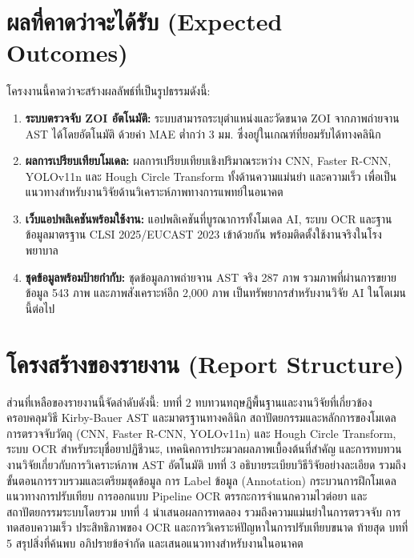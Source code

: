 \section{ผลที่คาดว่าจะได้รับ (Expected Outcomes)}

โครงงานนี้คาดว่าจะสร้างผลลัพธ์ที่เป็นรูปธรรมดังนี้:

\begin{enumerate}
  \item \textbf{ระบบตรวจจับ ZOI อัตโนมัติ:} ระบบสามารถระบุตำแหน่งและวัดขนาด ZOI จากภาพถ่ายจาน AST ได้โดยอัตโนมัติ ด้วยค่า MAE ต่ำกว่า 3 มม. ซึ่งอยู่ในเกณฑ์ที่ยอมรับได้ทางคลินิก
  \item \textbf{ผลการเปรียบเทียบโมเดล:} ผลการเปรียบเทียบเชิงปริมาณระหว่าง CNN, Faster R-CNN, YOLOv11n และ Hough Circle Transform ทั้งด้านความแม่นยำ และความเร็ว เพื่อเป็นแนวทางสำหรับงานวิจัยด้านวิเคราะห์ภาพทางการแพทย์ในอนาคต
  \item \textbf{เว็บแอปพลิเคชันพร้อมใช้งาน:} แอปพลิเคชันที่บูรณาการทั้งโมเดล AI, ระบบ OCR และฐานข้อมูลมาตรฐาน CLSI 2025/EUCAST 2023 เข้าด้วยกัน พร้อมติดตั้งใช้งานจริงในโรงพยาบาล
  \item \textbf{ชุดข้อมูลพร้อมป้ายกำกับ:} ชุดข้อมูลภาพถ่ายจาน AST จริง 287 ภาพ รวมภาพที่ผ่านการขยายข้อมูล 543 ภาพ และภาพสังเคราะห์อีก 2,000 ภาพ เป็นทรัพยากรสำหรับงานวิจัย AI ในโดเมนนี้ต่อไป
\end{enumerate}
\section{โครงสร้างของรายงาน (Report Structure)}

ส่วนที่เหลือของรายงานนี้จัดลำดับดังนี้: บทที่ 2 ทบทวนทฤษฎีพื้นฐานและงานวิจัยที่เกี่ยวข้อง ครอบคลุมวิธี Kirby-Bauer AST และมาตรฐานทางคลินิก สถาปัตยกรรมและหลักการของโมเดลการตรวจจับวัตถุ (CNN, Faster R-CNN, YOLOv11n) และ Hough Circle Transform, ระบบ OCR สำหรับระบุชื่อยาปฏิชีวนะ, เทคนิคการประมวลผลภาพเบื้องต้นที่สำคัญ และการทบทวนงานวิจัยเกี่ยวกับการวิเคราะห์ภาพ AST อัตโนมัติ บทที่ 3 อธิบายระเบียบวิธีวิจัยอย่างละเอียด รวมถึงขั้นตอนการรวบรวมและเตรียมชุดข้อมูล การ Label ข้อมูล (Annotation) กระบวนการฝึกโมเดล แนวทางการปรับเทียบ การออกแบบ Pipeline OCR ตรรกะการจำแนกความไวต่อยา และสถาปัตยกรรมระบบโดยรวม บทที่ 4 นำเสนอผลการทดลอง รวมถึงความแม่นยำในการตรวจจับ การทดสอบความเร็ว ประสิทธิภาพของ OCR และการวิเคราะห์ปัญหาในการปรับเทียบขนาด ท้ายสุด บทที่ 5 สรุปสิ่งที่ค้นพบ อภิปรายข้อจำกัด และเสนอแนวทางสำหรับงานในอนาคต
